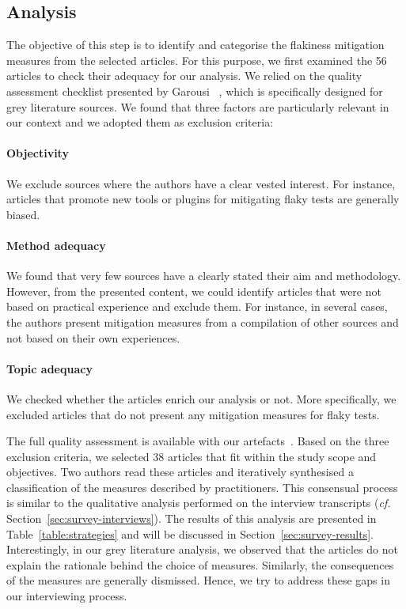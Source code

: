 \subsection{Analysis}
The objective of this step is to identify and categorise the flakiness mitigation measures from the selected articles.
For this purpose, we first examined the 56 articles to check their adequacy for our analysis.
We relied on the quality assessment checklist presented by Garousi \etal~\cite{garousi2019guidelines}, which is specifically designed for grey literature sources.
We found that three factors are particularly relevant in our context and we adopted them as exclusion criteria:
\paragraph{Objectivity} We exclude sources where the authors have a clear vested interest. For instance, articles that promote new tools or plugins for mitigating flaky tests are generally biased.
\paragraph{Method adequacy} We found that very few sources have a clearly stated their aim and methodology. However, from the presented content, we could identify articles that were not based on practical experience and exclude them. For instance, in several cases, the authors present mitigation measures from a compilation of other sources and not based on their own experiences.
\paragraph{Topic adequacy} We checked whether the articles enrich our analysis or not. More specifically, we excluded articles that do not present any mitigation measures for flaky tests.

The full quality assessment is available with our artefacts~\cite{artefacts}.
Based on the three exclusion criteria, we selected 38 articles that fit within the study scope and objectives.
Two authors read these articles and iteratively synthesised a classification of the measures described by practitioners.
This consensual process is similar to the qualitative analysis performed on the interview transcripts (\textit{cf.} Section~\ref{sec:survey-interviews}).
The results of this analysis are presented in Table~\ref{table:strategies} and will be discussed in Section~\ref{sec:survey-results}.
Interestingly, in our grey literature analysis, we observed that the articles do not explain the rationale behind the choice of measures.
Similarly, the consequences of the measures are generally dismissed.
Hence, we try to address these gaps in our interviewing process.

